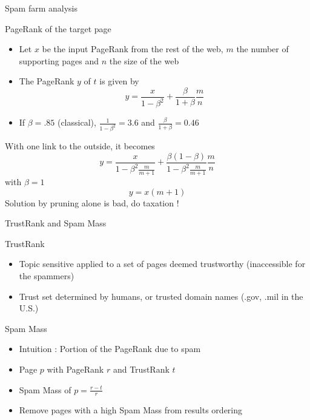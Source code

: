 \documentclass[10pt]{beamer}
\begin{document}
\begin{frame}[allowframebreaks]{Spam farm analysis}
  \begin{block}{PageRank of the target page}
    \begin{itemize}
      \item Let $x$ be the input PageRank from the rest of the web, $m$ the number of supporting pages and $n$ the size of the web
      \item The PageRank $y$ of $t$ is given by
        $$y = \frac{x}{1-\beta^2}+ \frac{\beta}{1+\beta} \frac{m}{n}$$
      \item If $\beta=.85$ (classical), $\frac{1}{1-\beta^2} = 3.6$ and $\frac{\beta}{1+\beta} = 0.46$
    \end{itemize}
  \end{block}
  \framebreak

  With one link to the outside, it becomes
  $$y = \frac{x}{1-\beta^2\frac{m}{m+1}}+ \frac{\beta(1-\beta)}{1-\beta^2\frac{m}{m+1}} \frac{m}{n}$$
  with $\beta=1$
  $$y = x(m+1)$$
  Solution by pruning alone is bad, do taxation !
\end{frame}

\begin{frame}{TrustRank and Spam Mass}
\begin{block}{TrustRank}
\begin{itemize}
\item Topic sensitive applied to a set of pages deemed trustworthy (inaccessible for the spammers)
\item Trust set determined by humans, or trusted domain names (.gov, .mil in the U.S.)
\end{itemize}
\end{block}
\begin{block}{Spam Mass}
\begin{itemize}
\item Intuition : Portion of the PageRank due to spam
\item Page $p$ with PageRank $r$ and TrustRank $t$
\item Spam Mass of $p = \frac{r-t}{r}$
\item Remove pages with a high Spam Mass from results ordering
\end{itemize}
\end{block}
\end{frame}
\end{document}
